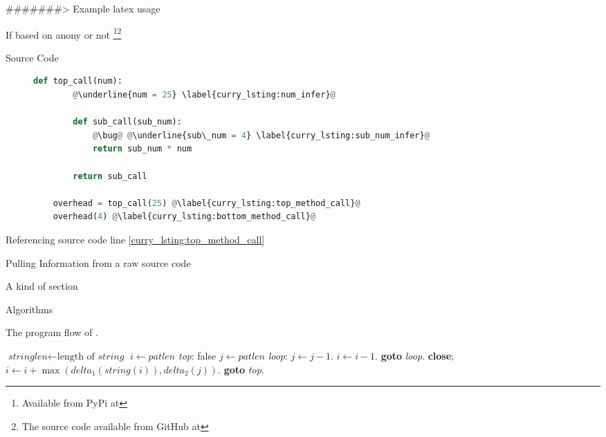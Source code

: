 #######> Example latex usage

If based on anony or not
\name\if{}\footnote{Available from PyPi at \selfrep{\PyPi}}\fi\footnote{The source code available from GitHub at \selfrep{\GitHub}}

Source Code
\begin{figure}[H]
    \centering\hspace*{-0.75in}
    	\begin{lstlisting}[language=Python,escapechar=@,caption={The curry programming pattern for Python. The underlined code is inserted in a new copy of the AST.}, captionpos=b,label={lst:python_curry}]
    def top_call(num):
    	@\underline{num = 25} \label{curry_lsting:num_infer}@
    
    	def sub_call(sub_num): 
    		@\bug@ @\underline{sub\_num = 4} \label{curry_lsting:sub_num_infer}@
    		return sub_num * num
    
    	return sub_call
    
    overhead = top_call(25) @\label{curry_lsting:top_method_call}@
    overhead(4) @\label{curry_lsting:bottom_method_call}@
    \end{lstlisting}
\end{figure}

Referencing source code line		
\ref{curry_lsting:top_method_call}

Pulling Information from a raw source code
\begin{figure}[H]
    \centering\hspace*{-0.75in}
        
\end{figure}

A kind of section

Algorithms

\begin{algorithm}
    \caption{The program flow of \name.} \label{algo:ProgramFlow}
    \begin{algorithmic}[1]
        \State $\textit{stringlen} \gets \text{length of }\textit{string}$
        \State $i \gets \textit{patlen}$
        \BState \emph{top}:
         \Return false
        \EndIf
        \State $j \gets \textit{patlen}$
        \BState \emph{loop}:
        \State $j \gets j-1$.
        \State $i \gets i-1$.
        \State \textbf{goto} \emph{loop}.
        \State \textbf{close};
        \EndIf
        \State $i \gets i+\max(\textit{delta}_1(\textit{string}(i)),\textit{delta}_2(j))$.
        \State \textbf{goto} \emph{top}.
        \EndProcedure
    \end{algorithmic}
\end{algorithm}
\fi
